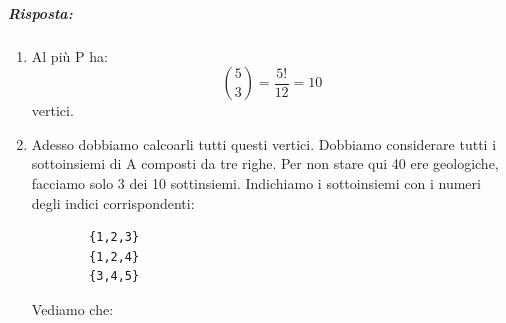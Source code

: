 \subparagraph{Risposta:}
\begin{enumerate}
    \item Al più P ha:
    \begin{equation*}
        \binom{5}{3} = \frac{5!}{12} = 10
    \end{equation*}
    vertici.
    \item Adesso dobbiamo calcoarli tutti questi vertici. Dobbiamo considerare tutti i sottoinsiemi di A composti da tre righe. Per non stare qui 40 ere geologiche, facciamo solo 3 dei 10 sottinsiemi. Indichiamo i sottoinsiemi con i numeri degli indici corrispondenti:
    \begin{verbatim}
        {1,2,3}
        {1,2,4}
        {3,4,5}
    \end{verbatim}
    Vediamo che:
    \begin{itemize}
    

\end{itemize}
\end{enumerate}
